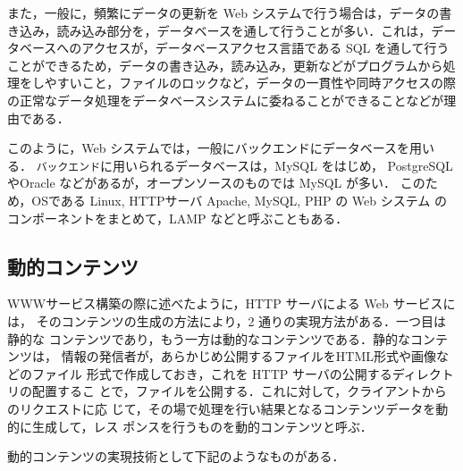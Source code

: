 また，一般に，頻繁にデータの更新を Web システムで行う場合は，データの書
き込み，読み込み部分を，データベースを通して行うことが多い．これは，デー
タベースへのアクセスが，データベースアクセス言語である SQL を通して行う
ことができるため，データの書き込み，読み込み，更新などがプログラムから処
理をしやすいこと，ファイルのロックなど，データの一貫性や同時アクセスの際
の正常なデータ処理をデータベースシステムに委ねることができることなどが理
由である．

このように，Web システムでは，一般にバックエンドにデータベースを用いる．
\texttt{バックエンド}に用いられるデータベースは，MySQL をはじめ，
PostgreSQL やOracle などがあるが，オープンソースのものでは MySQL が多い．
このため，OSである Linux, HTTPサーバ Apache, MySQL, PHP の Web システム
のコンポーネントをまとめて，LAMP などと呼ぶこともある．

\subsection{動的コンテンツ}

WWWサービス構築の際に述べたように，HTTP サーバによる Web サービスには，
そのコンテンツの生成の方法により，2 通りの実現方法がある．一つ目は静的な
コンテンツであり，もう一方は動的なコンテンツである．静的なコンテンツは，
情報の発信者が，あらかじめ公開するファイルをHTML形式や画像などのファイル
形式で作成しておき，これを HTTP サーバの公開するディレクトリの配置するこ
とで，ファイルを公開する．これに対して，クライアントからのリクエストに応
じて，その場で処理を行い結果となるコンテンツデータを動的に生成して，レス
ポンスを行うものを動的コンテンツと呼ぶ．

動的コンテンツの実現技術として下記のようなものがある．

